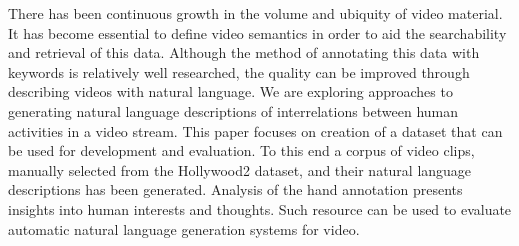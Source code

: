 There has been continuous growth in the volume and ubiquity of video material. It has become essential to define video semantics in order to aid the searchability and retrieval of this data. Although the method of annotating this data with keywords is relatively well researched, the quality can be improved through describing videos with natural language. We are exploring approaches to generating natural language descriptions of interrelations between human activities in a video stream. This paper focuses on creation of a dataset that can be used for development and evaluation. To this end a corpus of video clips, manually selected from the Hollywood2 dataset, and their natural language descriptions has been generated. Analysis of the hand annotation presents insights into human interests and thoughts. Such resource can be used to evaluate automatic natural language generation systems for video.
